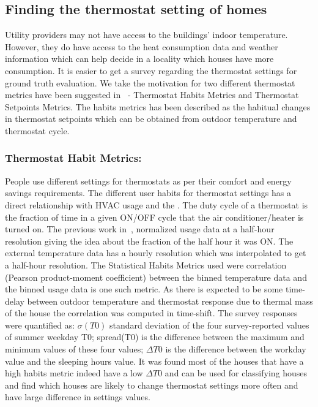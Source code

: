 \documentclass{sig-alternate}
\begin{document}
 
\subsection{Finding the thermostat setting of homes}

\indent Utility providers may not have access to the buildings' indoor temperature. However, they do have access to the heat consumption data and weather information which can help decide in a locality which houses have more consumption. It is easier to get a survey regarding the thermostat settings for ground truth evaluation. We take the motivation for two different thermostat metrics have been suggested in~\cite{Thermostat} - Thermostat Habits Metrics and Thermostat Setpoints Metrics. The habits metrics has been described as the habitual changes in thermostat setpoints which can be obtained from outdoor temperature and thermostat cycle. 

\subsubsection{\textbf{Thermostat Habit Metrics:} }

\indent People use different settings for thermostats as per their comfort and energy savings requirements. The different user habits for thermostat settings has a direct relationship with HVAC usage and the . The duty cycle of a thermostat is the fraction of time in a given ON/OFF cycle that the air conditioner/heater is turned on. The previous work in~\cite{Thermostat}, normalized usage data at a half-hour resolution giving the idea about the fraction of the half hour it was ON. The external temperature data has a hourly resolution which was interpolated to get a half-hour resolution. The Statistical Habits Metrics used were correlation (Pearson product-moment coefficient) between the binned temperature data and the binned usage data is one such metric. As there is expected to be some time-delay between outdoor temperature and thermostat response due to thermal mass of the house the correlation was computed in time-shift. The survey responses were quantified as: $\sigma (T0)$ standard deviation of the four survey-reported values of summer weekday T0; spread(T0) is the difference between the maximum and minimum values of these four values; $\Delta T0$ is the difference between the workday value and the sleeping hours value. It was found most of the houses that have a high habits metric indeed have a low $\Delta T0$ and can be used for classifying houses and find which houses are likely to change thermostat settings more often and have large difference in settings values. 
\end{document}
